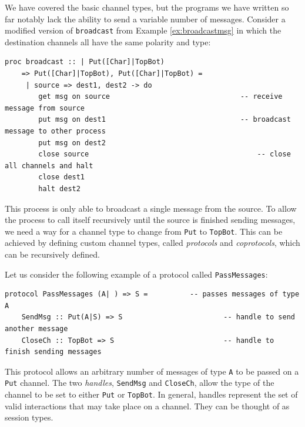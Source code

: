 \documentclass[11pt]{article}
\begin{document}
We have covered the basic channel types, but the programs we have written so far notably lack the ability to send a variable number of messages.
Consider a modified version of \lstinline$broadcast$ from Example \ref{ex:broadcastmsg} in which the destination channels all have the same polarity and type:
\begin{lstlisting}[label=ex:modbroadcast, caption=Process that broadcasts a message on output channels (without confirmation)] 
proc broadcast :: | Put([Char]|TopBot) 
	=> Put([Char]|TopBot), Put([Char]|TopBot) = 
	 | source => dest1, dest2 -> do
		get msg on source								-- receive message from source
		put msg on dest1								-- broadcast message to other process
		put msg on dest2
		close source										-- close all channels and halt
		close dest1
		halt dest2    
\end{lstlisting}
This process is only able to broadcast a single message from the source.
To allow the process to call itself recursively until the source is finished sending messages, we need a way for a channel type to change from \lstinline$Put$ to \lstinline$TopBot$.
This can be achieved by defining custom channel types, called {\em protocols} and {\em coprotocols}, which can be recursively defined.

Let us consider the following example of a protocol called \lstinline$PassMessages$:  
\begin{lstlisting}[label=ex:protocolpassmsgs, caption=Protocol for passing an arbitrary number of messages] 
protocol PassMessages (A| ) => S =			-- passes messages of type A
    SendMsg :: Put(A|S) => S 						-- handle to send another message
    CloseCh :: TopBot => S 							-- handle to finish sending messages
\end{lstlisting}
This protocol allows an arbitrary number of messages of type \lstinline$A$ to be passed on a \lstinline$Put$ channel.
The two {\em handles}, \lstinline$SendMsg$ and \lstinline$CloseCh$, allow the type of the channel to be set to either \lstinline$Put$ or \lstinline$TopBot$.
In general, handles represent the set of valid interactions that may take place on a channel.
They can be thought of as session types.
\end{document}

